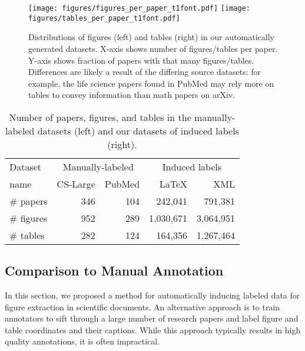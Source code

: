\documentclass[sigconf]{acmart}
\begin{document}
\begin{figure*}
\texttt{[image: figures/figures\_per\_paper\_t1font.pdf]}
\texttt{[image: figures/tables\_per\_paper\_t1font.pdf]}
\caption{Distributions of figures (left) and tables (right) in our automatically generated datasets. X-axis shows number of figures/tables per paper. Y-axis shows fraction of papers with that many figures/tables. Differences are likely a result of the differing source datasets: for example, the life science papers found in PubMed may rely more on tables to convey information than math papers on arXiv.
}
\label{fig:histogram}
\end{figure*}\begin{table}[t]
\begin{center}
\begin{tabular}{|l|rr|rr|} \hline
Dataset        & \multicolumn{2}{c|}{Manually-labeled} & \multicolumn{2}{c|}{Induced labels} \\
name & CS-Large \cite{pdffigures2} & PubMed & LaTeX & XML \\ \hline 
\# papers & 346   & 104      & 242,041 & 791,381   \\ 
\# figures & 952   & 289      & 1,030,671     & 3,064,951   \\ 
\# tables  & 282   & 124      & 164,356     & 1,267,464  \\ \hline
\end{tabular}
\vspace{0.2cm}
\caption{Number of papers, figures, and tables in the manually-labeled datasets (left) and our datasets of induced labels (right).}\label{tab:dataset_stats}
\end{center}
\end{table}\subsection{Comparison to Manual Annotation}\label{sec:dataset_stats}
In this section, we proposed a method for automatically inducing labeled data for figure extraction in scientific documents.
An alternative approach is to train annotators to sift through a large number of research papers and label figure and table coordinates and their captions.
While this approach typically results in high quality annotations, it is often impractical.
\end{document}
